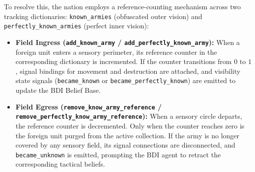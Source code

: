 To resolve this, the nation employs a reference-counting mechanism across two tracking dictionaries: \texttt{known\_armies} (obfuscated outer vision) and \texttt{perfectly\_known\_armies} (perfect inner vision):
\begin{itemize}
    \item \textbf{Field Ingress (\texttt{add\_known\_army} / \texttt{add\_perfectly\_known\_army}):} When a foreign unit enters a sensory perimeter, its reference counter in the corresponding dictionary is incremented. If the counter transitions from $0$ to $1$, signal bindings for movement and destruction are attached, and visibility state signals (\texttt{became\_known} or \texttt{became\_perfectly\_known}) are emitted to update the BDI Belief Base.
    \item \textbf{Field Egress (\texttt{remove\_know\_army\_reference} / \texttt{remove\_perfectly\_know\_army\_reference}):} When a sensory circle departs, the reference counter is decremented. Only when the counter reaches zero is the foreign unit purged from the active collection. If the army is no longer covered by any sensory field, its signal connections are disconnected, and \texttt{became\_unknown} is emitted, prompting the BDI agent to retract the corresponding tactical beliefs.
\end{itemize}

